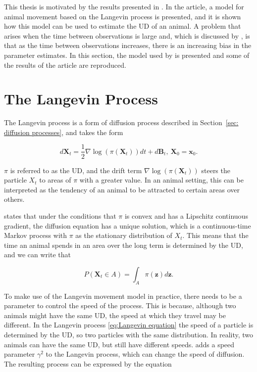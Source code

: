 
This thesis is motivated by the results presented in \textcite{michelot_langevin_2019}. In the article, a model for animal movement based on the Langevin process is presented, and it is shown how this model can be used to estimate the UD of an animal. A problem that arises when the time between observations is large and, which is discussed by \textcite{michelot_langevin_2019}, is that as the time between observations increases, there is an increasing bias in the parameter estimates. In this section, the model used by \textcite{michelot_langevin_2019} is presented and some of the results of the article are reproduced.



\section{The Langevin Process}
The Langevin process is a form of diffusion process described in Section~\ref{sec: diffusion processes}, and takes the form

\begin{equation}
    d\textbf{X}_t = \frac{1}{2} \nabla \log(\pi(\textbf{X}_t))dt + d\textbf{B}_t, \ \textbf{X}_0 = \textbf{x}_0.
    \label{eq:Langevin equation}
\end{equation}


$\pi$ is referred to as the UD, and the drift term $\nabla \log(\pi(\textbf{X}_t))$ steers the particle $X_t$ to areas of $\pi$ with a greater value. In an animal setting, this can be interpreted as the tendency of an animal to be attracted to certain areas over others.



\textcite{dalalyan_theoretical_2017} states that under the conditions that $\pi$ is convex and has a Lipschitz continuous gradient, the diffusion equation has a unique solution, which is a continuous-time Markov process with $\pi$ as the stationary distribution of $X_t$. This means that the time an animal spends in an area over the long term is determined by the UD, and we can write that

$$
    P(\textbf{X}_t \in A ) = \int_A \pi(\textbf{z})d\textbf{z}.
$$


To make use of the Langevin movement model in practice, there needs to be a parameter to control the speed of the process. This is because, although two animals might have the same UD, the speed at which they travel may be different. In the Langevin process \eqref{eq:Langevin equation} the speed of a particle is determined by the UD, so two particles with the same distribution. In reality, two animals can have the same UD, but still have different speeds. \textcite{roberts_optimal_1998} adds a speed parameter $\gamma^2$ to the Langevin process, which can change the speed of diffusion. The resulting process can be expressed by the equation


